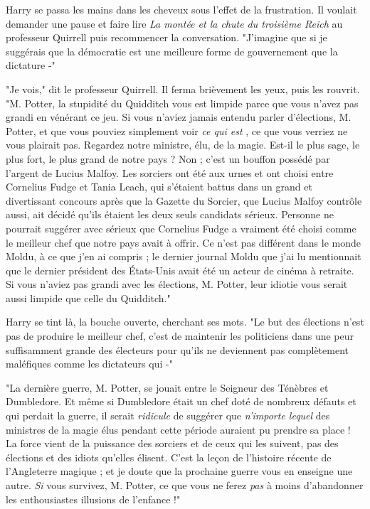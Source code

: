 Harry se passa les mains dans les cheveux sous l'effet de la frustration. Il voulait demander une pause et faire lire \emph{La montée et la chute du troisième Reich}  au professeur Quirrell puis recommencer la conversation. "J'imagine que si je suggérais que la démocratie est une meilleure forme de gouvernement que la dictature -"

"Je vois," dit le professeur Quirrell. Il ferma brièvement les yeux, puis les rouvrit. "M. Potter, la stupidité du Quidditch vous est limpide parce que vous n'avez pas grandi en vénérant ce jeu. Si vous n'aviez jamais entendu parler d'élections, M. Potter, et que vous pouviez simplement voir \emph{ce qui est} , ce que vous verriez ne vous plairait pas. Regardez notre ministre, élu, de la magie. Est-il le plus sage, le plus fort, le plus grand de notre pays ? Non ; c'est un bouffon possédé par l'argent de Lucius Malfoy. Les sorciers ont été aux urnes et ont choisi entre Cornelius Fudge et Tania Leach, qui s'étaient battus dans un grand et divertissant concours après que la Gazette du Sorcier, que Lucius Malfoy contrôle aussi, ait décidé qu'ils étaient les deux seuls candidats sérieux. Personne ne pourrait suggérer avec sérieux que Cornelius Fudge a vraiment été choisi comme le meilleur chef que notre pays avait à offrir. Ce n'est pas différent dans le monde Moldu, à ce que j'en ai compris ; le dernier journal Moldu que j'ai lu mentionnait que le dernier président des États-Unis avait été un acteur de cinéma à retraite. Si vous n'aviez pas grandi avec les élections, M. Potter, leur idiotie vous serait aussi limpide que celle du Quidditch."

Harry se tint là, la bouche ouverte, cherchant ses mots. "Le but des élections n'est pas de produire le meilleur chef, c'est de maintenir les politiciens dans une peur suffisamment grande des électeurs pour qu'ils ne deviennent pas complètement maléfiques comme les dictateurs qui -"

"La dernière guerre, M. Potter, se jouait entre le Seigneur des Ténèbres et Dumbledore. Et même si Dumbledore était un chef doté de nombreux défauts et qui perdait la guerre, il serait \emph{ridicule}  de suggérer que \emph{n'importe lequel}  des ministres de la magie élus pendant cette période auraient pu prendre sa place ! La force vient de la puissance des sorciers et de ceux qui les suivent, pas des élections et des idiots qu'elles élisent. C'est la leçon de l'histoire récente de l'Angleterre magique ; et je doute que la prochaine guerre vous en enseigne une autre. \emph{Si}  vous survivez, M. Potter, ce que vous ne ferez \emph{pas}  à moins d'abandonner les enthousiastes illusions de l'enfance !"

